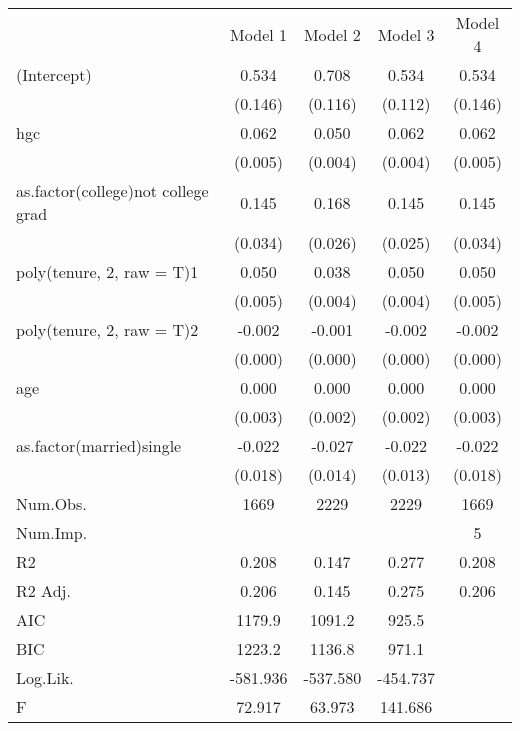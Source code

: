 \documentclass{article}
\begin{document}
\begin{table}
\centering
\begin{tabular}[t]{lcccc}

  & Model 1 & Model 2 & Model 3 & Model 4\\

(Intercept) & 0.534 & 0.708 & 0.534 & 0.534\\
 & (0.146) & (0.116) & (0.112) & (0.146)\\
hgc & 0.062 & 0.050 & 0.062 & 0.062\\
 & (0.005) & (0.004) & (0.004) & \vphantom{1} (0.005)\\
as.factor(college)not college grad & 0.145 & 0.168 & 0.145 & 0.145\\
 & (0.034) & (0.026) & (0.025) & (0.034)\\
poly(tenure, 2, raw = T)1 & 0.050 & 0.038 & 0.050 & 0.050\\
 & (0.005) & (0.004) & (0.004) & (0.005)\\
poly(tenure, 2, raw = T)2 & -0.002 & -0.001 & -0.002 & -0.002\\
 & (0.000) & (0.000) & (0.000) & (0.000)\\
age & 0.000 & 0.000 & 0.000 & 0.000\\
 & (0.003) & (0.002) & (0.002) & (0.003)\\
as.factor(married)single & -0.022 & -0.027 & -0.022 & -0.022\\
 & (0.018) & (0.014) & (0.013) & (0.018)\\

Num.Obs. & 1669 & 2229 & 2229 & 1669\\
Num.Imp. &  &  &  & 5\\
R2 & 0.208 & 0.147 & 0.277 & 0.208\\
R2 Adj. & 0.206 & 0.145 & 0.275 & 0.206\\
AIC & 1179.9 & 1091.2 & 925.5 & \\
BIC & 1223.2 & 1136.8 & 971.1 & \\
Log.Lik. & -581.936 & -537.580 & -454.737 & \\
F & 72.917 & 63.973 & 141.686 & \\

\end{tabular}
\end{table}
\end{document}
